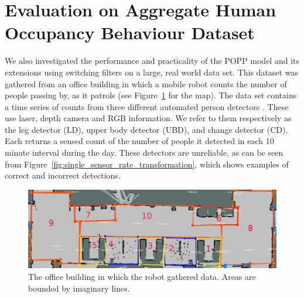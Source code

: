
\section{Evaluation on Aggregate Human Occupancy Behaviour Dataset}
\label{sec:evareal}

We also investigated the performance and practicality of the POPP model and its extensions using switching filters on a large, real world data set.
% 
This dataset was gathered from an office building in which a mobile robot counts the number of people passing by, as it patrols (see Figure~\ref{fig:map_popp_independent_test} for the map). The data set contains a time series of counts from three different automated person detectors \cite{dondrup2015real}. These use laser, depth camera and RGB information. We refer to them respectively as the leg detector (LD), upper body detector (UBD), and change detector (CD). Each returns a sensed count of the number of people it detected in each 10 minute interval during the day. These detectors are unreliable, as can be seen from Figure~\ref{fig:single_sensor_rate_transformation}, which shows examples of correct and incorrect detections.

\begin{figure}[t]
	\centering
	\includegraphics[width=0.95\columnwidth]{./figures/map_popp.png}
	\caption{The office building in which the robot gathered data. Areas are bounded by imaginary lines.}
	\label{fig:map_popp_independent_test}
\end{figure}

